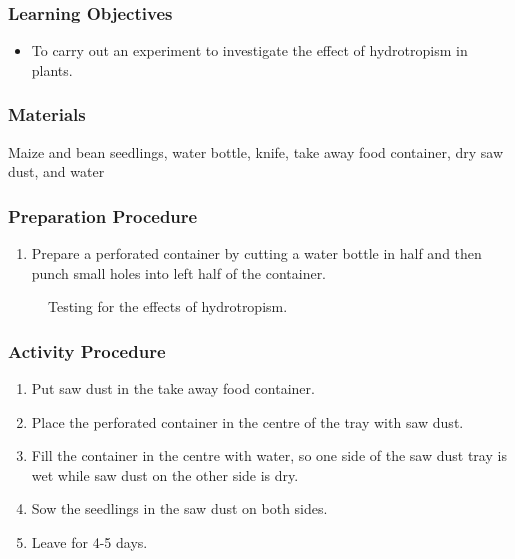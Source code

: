 \subsubsection*{Learning Objectives}
\begin{itemize}
\item{To carry out an experiment to investigate the effect of hydrotropism in plants.}
\end{itemize}


\subsubsection*{Materials}
Maize and bean seedlings, water bottle, knife, take away food container, dry saw dust, and water

\subsubsection*{Preparation Procedure}
\begin{enumerate}
\item{Prepare a perforated container by cutting a water bottle in half and then punch small holes into left half of the container.}
\end{enumerate}

\begin{figure}[h]
\begin{center}
\def\svgwidth{12cm}

\caption{Testing for the effects of hydrotropism.}
\label{fig:hydro}
\end{center}
\end{figure}

\subsubsection*{Activity Procedure}
\begin{enumerate}
\item{Put saw dust in the take away food container.}
\item{Place the perforated container in the centre of the tray with saw dust.}
\item{Fill the container in the centre with water, so one side of the saw dust tray is wet while saw dust on the other side is dry.}
\item{Sow the seedlings in the saw dust on both sides.}
\item{Leave for 4-5 days.}
\end{enumerate}

